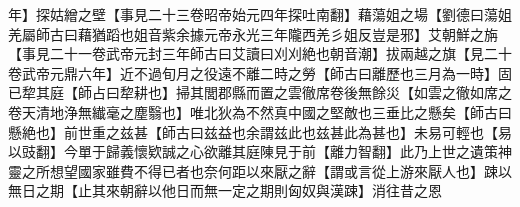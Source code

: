 年】探姑繒之壁【事見二十三卷昭帝始元四年探吐南翻】藉蕩姐之場【劉德曰蕩姐羌屬師古曰藉猶蹈也姐音紫余據元帝永光三年隴西羌彡姐反豈是邪】艾朝鮮之旃【事見二十一卷武帝元封三年師古曰艾讀曰刈刈絶也朝音潮】拔兩越之旗【見二十卷武帝元鼎六年】近不過旬月之役遠不離二時之勞【師古曰離歷也三月為一時】固已犂其庭【師占曰犂耕也】掃其閭郡縣而置之雲徹席卷後無餘災【如雲之徹如席之卷天清地浄無纎毫之塵翳也】唯北狄為不然真中國之堅敵也三垂比之懸矣【師古曰懸絶也】前世重之兹甚【師古曰兹益也余謂兹此也兹甚此為甚也】未易可輕也【易以豉翻】今單于歸義懷欵誠之心欲離其庭陳見于前【離力智翻】此乃上世之遺策神靈之所想望國家雖費不得已者也奈何距以來厭之辭【謂或言從上游來厭人也】踈以無日之期【止其來朝辭以他日而無一定之期則匈奴與漢踈】消往昔之恩